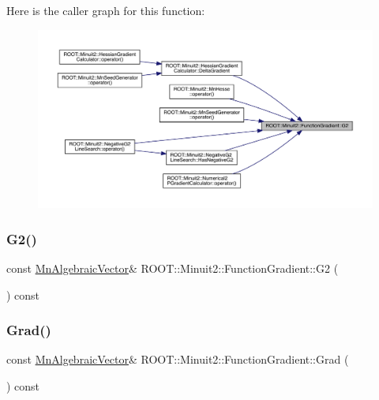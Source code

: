 Here is the caller graph for this function\+:\nopagebreak
\begin{figure}[H]
\begin{center}
\leavevmode
\includegraphics[width=350pt]{d3/d48/classROOT_1_1Minuit2_1_1FunctionGradient_a6f99988a7fd1a61ed96c6709f02b6041_icgraph}
\end{center}
\end{figure}
\mbox{\label{classROOT_1_1Minuit2_1_1FunctionGradient_a6f99988a7fd1a61ed96c6709f02b6041}} 
\subsubsection{\texorpdfstring{G2()}{G2()}\hspace{0.1cm}{\footnotesize\ttfamily [2/2]}}
{\footnotesize\ttfamily const \mbox{\hyperlink{namespaceROOT_1_1Minuit2_a62ed97730a1ca8d3fbaec64a19aa11c9}{Mn\+Algebraic\+Vector}}\& R\+O\+O\+T\+::\+Minuit2\+::\+Function\+Gradient\+::\+G2 (\begin{DoxyParamCaption}{ }\end{DoxyParamCaption}) const\hspace{0.3cm}{\ttfamily [inline]}}

\mbox{\label{classROOT_1_1Minuit2_1_1FunctionGradient_a0effb8dbe0115928f72f122621ba4ad3}} 
\subsubsection{\texorpdfstring{Grad()}{Grad()}\hspace{0.1cm}{\footnotesize\ttfamily [1/2]}}
{\footnotesize\ttfamily const \mbox{\hyperlink{namespaceROOT_1_1Minuit2_a62ed97730a1ca8d3fbaec64a19aa11c9}{Mn\+Algebraic\+Vector}}\& R\+O\+O\+T\+::\+Minuit2\+::\+Function\+Gradient\+::\+Grad (\begin{DoxyParamCaption}{ }\end{DoxyParamCaption}) const\hspace{0.3cm}{\ttfamily [inline]}}

